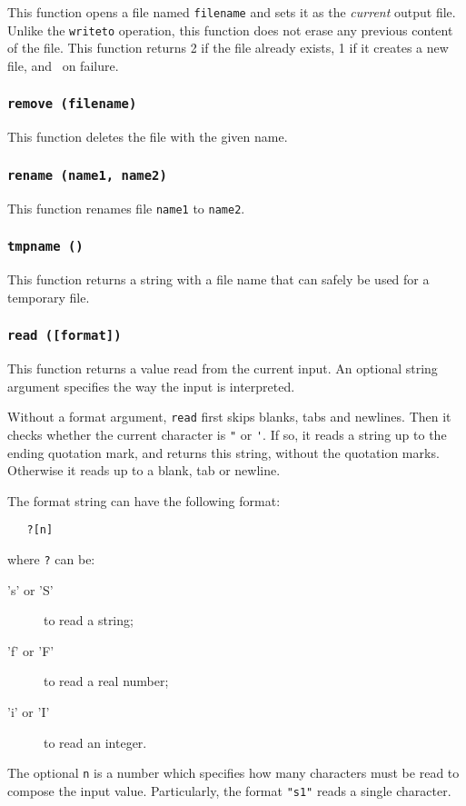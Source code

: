 This function opens a file named \verb'filename' and sets it as the
{\em current} output file.
Unlike the \verb'writeto' operation,
this function does not erase any previous content of the file.
This function returns 2 if the file already exists,
1 if it creates a new file, and \nil\ on failure.

\subsubsection*{{\tt remove (filename)}}

This function deletes the file with the given name.

\subsubsection*{{\tt rename (name1, name2)}}

This function renames file \verb'name1' to \verb'name2'.

\subsubsection*{{\tt tmpname ()}}

This function returns a string with a file name that can safely
be used for a temporary file.

\subsubsection*{{\tt read ([format])}}

This function returns a value read from the current input.
An optional string argument specifies the way the input is interpreted.

Without a format argument, {\tt read} first skips blanks, tabs and newlines.
Then it checks whether the current character is \verb'"' or \verb-'-.
If so, it reads a string up to the ending quotation mark,
and returns this string, without the quotation marks.
Otherwise it reads up to a blank, tab or newline.

The format string can have the following format:
\begin{verbatim}
   ?[n]
\end{verbatim}
where \verb'?' can be:
\begin{description}
\item['s' or 'S'] to read a string;
\item['f' or 'F'] to read a real number;
\item['i' or 'I'] to read an integer.
\end{description}
The optional \verb'n' is a number which specifies how many characters
must be read to compose the input value.
Particularly, the format \verb'"s1"' reads a single character.

